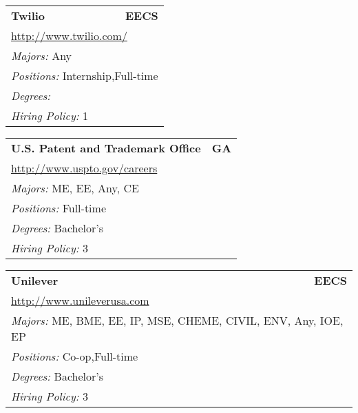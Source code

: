 \documentclass[twoside]{article}
\begin{document}
\begin{center}
\begin{multicols}{3}
\begin{FlushLeft}
\begin{minipage}{\columnwidth}
\end{minipage}
 
\begin{minipage}{\columnwidth}\begin{tabularx}{.95\columnwidth}{Xr}
                 {\Large\bf Twilio} & {\Large\bf EECS}\\
    \multicolumn{2}{p{.95\columnwidth}}{\url{http://www.twilio.com/}}\\
    \multicolumn{2}{p{.95\columnwidth}}{\emph{Majors:} Any}\\
    \multicolumn{2}{p{.95\columnwidth}}{\emph{Positions:} Internship,Full-time}\\
    \multicolumn{2}{p{.95\columnwidth}}{\emph{Degrees:} }\\
    \multicolumn{2}{p{.95\columnwidth}}{\emph{Hiring Policy:} 1}\\
    \end{tabularx}
    
\end{minipage}
 
\begin{minipage}{\columnwidth}\begin{tabularx}{.95\columnwidth}{Xr}
                 {\Large\bf U.S. Patent and Trademark Office} & {\Large\bf GA}\\
    \multicolumn{2}{p{.95\columnwidth}}{\url{http://www.uspto.gov/careers}}\\
    \multicolumn{2}{p{.95\columnwidth}}{\emph{Majors:} ME, EE, Any, CE}\\
    \multicolumn{2}{p{.95\columnwidth}}{\emph{Positions:} Full-time}\\
    \multicolumn{2}{p{.95\columnwidth}}{\emph{Degrees:} Bachelor's}\\
    \multicolumn{2}{p{.95\columnwidth}}{\emph{Hiring Policy:} 3}\\
    \end{tabularx}
    
\end{minipage}
 
\begin{minipage}{\columnwidth}\begin{tabularx}{.95\columnwidth}{Xr}
                 {\Large\bf Unilever} & {\Large\bf EECS}\\
    \multicolumn{2}{p{.95\columnwidth}}{\url{http://www.unileverusa.com}}\\
    \multicolumn{2}{p{.95\columnwidth}}{\emph{Majors:} ME, BME, EE, IP, MSE, CHEME, CIVIL, ENV, Any, IOE, EP}\\
    \multicolumn{2}{p{.95\columnwidth}}{\emph{Positions:} Co-op,Full-time}\\
    \multicolumn{2}{p{.95\columnwidth}}{\emph{Degrees:} Bachelor's}\\
    \multicolumn{2}{p{.95\columnwidth}}{\emph{Hiring Policy:} 3}\\
    \end{tabularx}
    

\end{minipage}
\end{FlushLeft}
\end{multicols}
\end{center}
\end{document}
